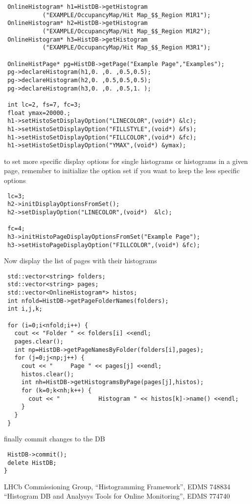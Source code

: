 \documentclass{lhcbnote}
\begin{document}
\begin{verbatim}
 OnlineHistogram* h1=HistDB->getHistogram
           ("EXAMPLE/OccupancyMap/Hit Map_$$_Region M1R1");
 OnlineHistogram* h2=HistDB->getHistogram
           ("EXAMPLE/OccupancyMap/Hit Map_$$_Region M1R2");
 OnlineHistogram* h3=HistDB->getHistogram
           ("EXAMPLE/OccupancyMap/Hit Map_$$_Region M3R1");

 OnlineHistPage* pg=HistDB->getPage("Example Page","Examples");
 pg->declareHistogram(h1,0. ,0. ,0.5,0.5);
 pg->declareHistogram(h2,0. ,0.5,0.5,0.5);
 pg->declareHistogram(h3,0. ,0. ,0.5,1. );

 int lc=2, fs=7, fc=3;
 float ymax=20000.;
 h1->setHistoSetDisplayOption("LINECOLOR",(void*) &lc);
 h1->setHistoSetDisplayOption("FILLSTYLE",(void*) &fs);
 h1->setHistoSetDisplayOption("FILLCOLOR",(void*) &fc); 
 h1->setHistoSetDisplayOption("YMAX",(void*) &ymax); 
 \end{verbatim}
to set more specific display options for single histograms or
histograms in a given page, remember to initialize the option set if
you want to keep the less specific options
\begin{verbatim}
 lc=3;
 h2->initDisplayOptionsFromSet();
 h2->setDisplayOption("LINECOLOR",(void*)  &lc);

 fc=4;
 h3->initHistoPageDisplayOptionsFromSet("Example Page");
 h3->setHistoPageDisplayOption("FILLCOLOR",(void*) &fc);
\end{verbatim}
Now display the list of pages with their histograms
\begin{verbatim}
 std::vector<string> folders;
 std::vector<string> pages;
 std::vector<OnlineHistogram*> histos; 
 int nfold=HistDB->getPageFolderNames(folders);
 int i,j,k;

 for (i=0;i<nfold;i++) {
   cout << "Folder " << folders[i] <<endl;
   pages.clear();
   int np=HistDB->getPageNamesByFolder(folders[i],pages);
   for (j=0;j<np;j++) {
     cout << "     Page " << pages[j] <<endl;
     histos.clear();
     int nh=HistDB->getHistogramsByPage(pages[j],histos);
     for (k=0;k<nh;k++) {
       cout << "           Histogram " << histos[k]->name() <<endl;
     }    
   }
 }
\end{verbatim}




finally commit changes to the DB
\begin{verbatim}
 HistDB->commit();
 delete HistDB;
}
\end{verbatim}


\begin{thebibliography}{99}
LHCb Commissioning Group, ``Histogramming Framework'', EDMS 748834
``Histogram DB and Analysys Tools for Online Monitoring'', EDMS 774740

\end{thebibliography}
\end{document}
